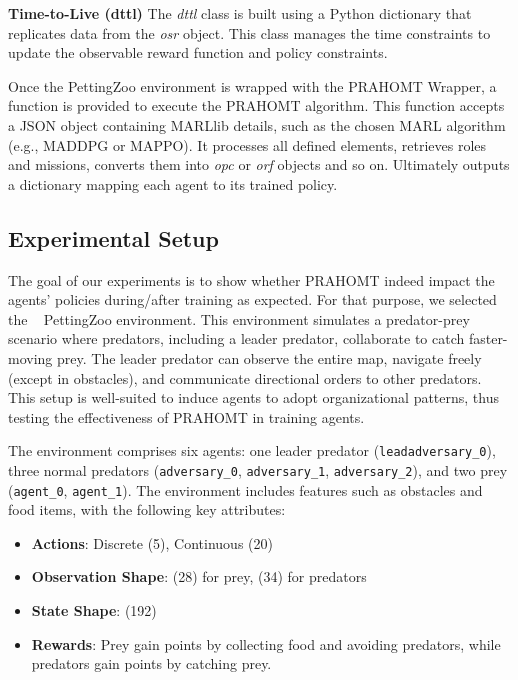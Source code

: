 \documentclass[runningheads]{llncs}
\theoremstyle{freethm}
\theoremstyle{proofoutline}
\begin{document}
\textbf{Time-to-Live (dttl)} \quad The \textit{dttl} class is built using a Python dictionary that replicates data from the \textit{osr} object. This class manages the time constraints to update the observable reward function and policy constraints.

Once the PettingZoo environment is wrapped with the PRAHOMT Wrapper, a function is provided to execute the PRAHOMT algorithm. This function accepts a JSON object containing MARLlib details, such as the chosen MARL algorithm (e.g., MADDPG or MAPPO). It processes all defined elements, retrieves roles and missions, converts them into \textit{opc} or \textit{orf} objects and so on. Ultimately outputs a dictionary mapping each agent to its trained policy.

\subsection{Experimental Setup}

The goal of our experiments is to show whether PRAHOMT indeed impact the agents' policies during/after training as expected. For that purpose, we selected the ~\cite{Lowe2017} PettingZoo environment. This environment simulates a predator-prey scenario where predators, including a leader predator, collaborate to catch faster-moving prey. The leader predator can observe the entire map, navigate freely (except in obstacles), and communicate directional orders to other predators. This setup is well-suited to induce agents to adopt organizational patterns, thus testing the effectiveness of PRAHOMT in training agents.

The  environment comprises six agents: one leader predator (\texttt{leadadversary\_0}), three normal predators (\texttt{adversary\_0}, \texttt{adversary\_1}, \texttt{adversary\_2}), and two prey (\texttt{agent\_0}, \texttt{agent\_1}). The environment includes features such as obstacles and food items, with the following key attributes:

\begin{itemize}
    \item \textbf{Actions}: Discrete (5), Continuous (20)
    \item \textbf{Observation Shape}: (28) for prey, (34) for predators
    \item \textbf{State Shape}: (192)
    \item \textbf{Rewards}: Prey gain points by collecting food and avoiding predators, while predators gain points by catching prey.
\end{itemize}
\end{document}
